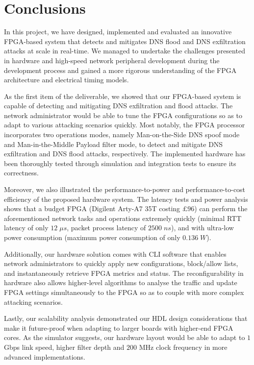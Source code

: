 \documentclass[a4paper]{report}
\begin{document}
\section{Conclusions}
In this project, we have designed, implemented and evaluated an innovative FPGA-based system that detects and mitigates DNS flood and DNS exfiltration attacks at scale in real-time. We managed to undertake the challenges presented in hardware and high-speed network peripheral development during the development process and gained a more rigorous understanding of the FPGA architecture and electrical timing models.

As the first item of the deliverable, we showed that our FPGA-based system is capable of detecting and mitigating DNS exfiltration and flood attacks. The network administrator would be able to tune the FPGA configurations so as to adapt to various attacking scenarios quickly. Most notably, the FPGA processor incorporates two operations modes, namely Man-on-the-Side DNS spoof mode and Man-in-the-Middle Payload filter mode, to detect and mitigate DNS exfiltration and DNS flood attacks, respectively. The implemented hardware has been thoroughly tested through simulation and integration tests to ensure its correctness.

Moreover, we also illustrated the performance-to-power and performance-to-cost efficiency of the proposed hardware system. The latency tests and power analysis shows that a budget FPGA (Digilent Arty-A7 35T costing $£96$) can perform the aforementioned network tasks and operations extremely quickly (minimal RTT latency of only $12\; \mu s$, packet process latency of $2500\; ns$), and with ultra-low power consumption (maximum power consumption of only $0.136\; W$). 

Additionally, our hardware solution comes with CLI software that enables network administrators to quickly apply new configurations, block/allow lists, and instantaneously retrieve FPGA metrics and status. The reconfigurability in hardware also allows higher-level algorithms to analyse the traffic and update FPGA settings simultaneously to the FPGA so as to couple with more complex attacking scenarios.

Lastly, our scalability analysis demonstrated our HDL design considerations that make it future-proof when adapting to larger boards with higher-end FPGA cores. As the simulator suggests, our hardware layout would be able to adapt to $1$ Gbps link speed, higher filter depth and $200$ MHz clock frequency in more advanced implementations.
\end{document}

